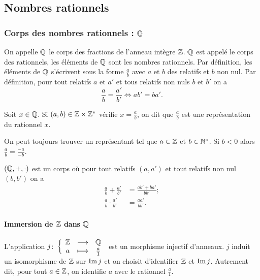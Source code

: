 \subsection{Nombres rationnels}

\subsubsection{Corps des nombres rationnels : \(\mathbb{Q}\)}

\begin{defdef}
  On appelle \(\mathbb{Q}\) le corps des fractions de l'anneau intègre \(\mathbb{Z}\). \(\mathbb{Q}\) est appelé le corps des rationnels, les éléments de \(\mathbb{Q}\) sont les nombres rationnels. Par définition, les éléments de \(\mathbb{Q}\) s'écrivent sous la forme \(\frac{a}{b}\) avec \(a\) et \(b\) des relatifs et \(b\) non nul. Par définition, pour tout relatifs \(a\) et \(a'\) et tous relatifs non nuls \(b\) et \(b'\) on a
  \begin{equation}
    \frac{a}{b} = \frac{a'}{b'} \iff ab'=ba'.
  \end{equation}
\end{defdef}
\begin{defdef}
  Soit \(x \in \mathbb{Q}\). Si \((a,b) \in \mathbb{Z} \times \mathbb{Z}^*\) vérifie \(x=\frac{a}{b}\), on dit que \(\frac{a}{b}\) est une représentation du rationnel \(x\).
\end{defdef}

On peut toujours trouver un représentant tel que \(a \in \mathbb{Z}\) et \(b \in \mathbb{N}^*\). Si \(b <0\) alors \(\frac{a}{b}=\frac{-a}{-b}\).

\((\mathbb{Q}, +, \cdot)\) est un corps où pour tout relatifs \((a,a')\) et tout relatifs non nul \((b,b')\) on a
\begin{align}
  \frac{a}{b}+\frac{a'}{b'} &= \frac{ab'+ba'}{bb'}; \\
  \frac{a}{b} \cdot \frac{a'}{b'} &= \frac{aa'}{bb'}.
\end{align}

\paragraph{Immersion de \(\mathbb{Z}\) dans \(\mathbb{Q}\)}

L'application \(j\colon \left\{\begin{array}{ccc} \mathbb{Z} & \longrightarrow &\mathbb{Q}\\ a & \longmapsto & \frac{a}{1} \end{array} \right.\) est un morphisme injectif d'anneaux. \(j\) induit un isomorphisme de \(\mathbb{Z}\) sur \(\operatorname{Im}{j}\) et on choisit d'identifier \(\mathbb{Z}\) et \(\operatorname{Im}{j}\). Autrement dit, pour tout \(a \in \mathbb{Z}\), on identifie \(a\) avec le rationnel \(\frac{a}{1}\).

